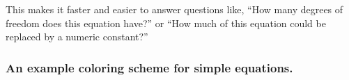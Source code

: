 \documentclass[12pt,letterpaper]{article}
\begin{document}

This makes it faster and easier to answer questions like,
``How many degrees of freedom does this equation have?''
or
``How much of this equation could be replaced by a numeric constant?''

\subsubsection{An example coloring scheme for simple equations.}

\boldmath

\newcommand{\op}{\textcolor{Plum}} %
\newcommand{\fv}{\textcolor{green}} %
\newcommand{\iv}{\textcolor{red}} %
\newcommand{\fc}{\textcolor{blue}} %
\newcommand{\bv}{\textcolor{Gray}} %
\newcommand{\nt}{\textcolor{black}} %


\end{document}
